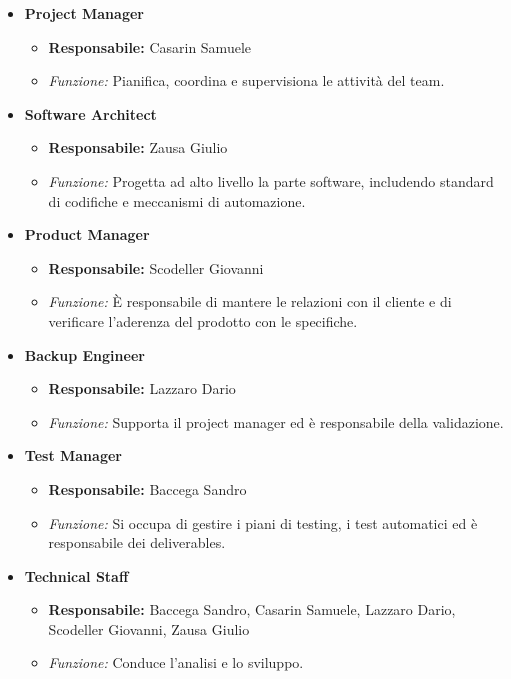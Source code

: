 \documentclass{article}
\begin{document}
\begin{itemize}
\item
\textbf{Project Manager}

\begin{itemize}
\item
\textbf{Responsabile:} Casarin Samuele
\item
\textit{Funzione: }Pianifica, coordina e supervisiona le attività del team.
\end{itemize}
\item
\textbf{Software Architect}

\begin{itemize}
\item
\textbf{Responsabile:} Zausa Giulio
\item
\textit{Funzione: }Progetta ad alto livello la parte software, includendo
standard di codifiche e meccanismi di automazione.
\end{itemize}
\item
\textbf{Product Manager}

\begin{itemize}
\item
\textbf{Responsabile:} Scodeller Giovanni
\item
\textit{Funzione: }È responsabile di mantere le relazioni con il cliente e di
verificare l'aderenza del prodotto con le specifiche.
\end{itemize}
\item
\textbf{Backup Engineer}

\begin{itemize}
\item
\textbf{Responsabile:} Lazzaro Dario
\item
\textit{Funzione: }Supporta il project manager ed è responsabile della
validazione.
\end{itemize}
\item
\textbf{Test Manager}

\begin{itemize}
\item
\textbf{Responsabile:} Baccega Sandro
\item
\textit{Funzione: }Si occupa di gestire i piani di testing, i test automatici
ed è responsabile dei deliverables.
\end{itemize}
\item
\textbf{Technical Staff}

\begin{itemize}
\item
\textbf{Responsabile:} Baccega Sandro, Casarin Samuele, Lazzaro Dario, Scodeller Giovanni, Zausa Giulio
\item
\textit{Funzione: }Conduce l'analisi e lo sviluppo.
\end{itemize}
\end{itemize}
\end{document}
